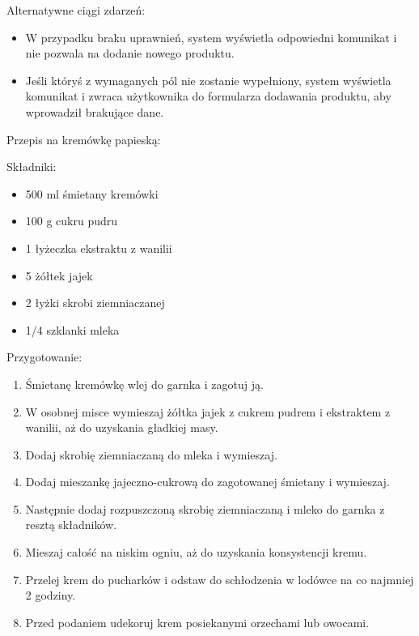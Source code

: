 \documentclass[
]{article}
\providecommand{\tightlist}{%
  \setlength{\itemsep}{0pt}\setlength{\parskip}{0pt}}
\begin{document}
{Alternatywne ciągi zdarzeń:}

\begin{itemize}
\tightlist
\item
  {W przypadku braku uprawnień, system wyświetla odpowiedni komunikat i
  nie pozwala na dodanie nowego produktu.}
\item
  {Jeśli któryś z wymaganych pól nie zostanie wypełniony, system
  wyświetla komunikat i zwraca użytkownika do formularza dodawania
  produktu, aby wprowadził brakujące dane.}
\end{itemize}

{}

{Przepis na kremówkę papieską:}

{Składniki:}

\begin{itemize}
\tightlist
\item
  {500 ml śmietany kremówki}
\item
  {100 g cukru pudru}
\item
  {1 łyżeczka ekstraktu z wanilii}
\item
  {5 żółtek jajek}
\item
  {2 łyżki skrobi ziemniaczanej}
\item
  {1/4 szklanki mleka}
\end{itemize}

{Przygotowanie:}

\begin{enumerate}
\tightlist
\item
  {Śmietanę kremówkę wlej do garnka i zagotuj ją.}
\item
  {W osobnej misce wymieszaj żółtka jajek z cukrem pudrem i ekstraktem z
  wanilii, aż do uzyskania gładkiej masy.}
\item
  {Dodaj skrobię ziemniaczaną do mleka i wymieszaj.}
\item
  {Dodaj mieszankę jajeczno-cukrową do zagotowanej śmietany i
  wymieszaj.}
\item
  {Następnie dodaj rozpuszczoną skrobię ziemniaczaną i mleko do garnka z
  resztą składników.}
\item
  {Mieszaj całość na niskim ogniu, aż do uzyskania konsystencji kremu.}
\item
  {Przelej krem do pucharków i odstaw do schłodzenia w lodówce na co
  najmniej 2 godziny.}
\item
  {Przed podaniem udekoruj krem posiekanymi orzechami lub owocami.}
\end{enumerate}
\end{document}
